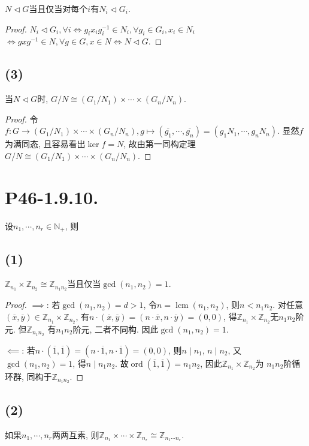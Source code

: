 \documentclass[12pt, a4paper, fontset=windows]{ctexart}
\newcommand{\N}{\mathbb{N}}
\newcommand{\Z}{\mathbb{Z}}
\newcommand{\cl}[1]{\overline{#1}} %
\newcommand{\isom}{\cong} %
\newcommand{\lcm}{\operatorname{lcm}}
\newcommand{\ord}{\operatorname{ord}}
\newcommand{\timess}{\times\cdots\times}
\begin{document}
$N\lhd G$当且仅当对每个$i$有$N_i\lhd G_i$. 

\begin{proof}
$N_i\lhd G_i,\forall i\iff g_ix_ig_i^{-1}\in N_i,
\forall g_i\in G_i,x_i\in N_i$
$\iff gxg^{-1}\in N,\forall g\in G,x\in N\iff N\lhd G$. 
\end{proof}

\subsection*{(3)}

当$N\lhd G$时, $G/N\isom(G_1/N_1)\timess(G_n/N_n)$. 

\begin{proof}
令$f:G\to (G_1/N_1)\timess(G_n/N_n),g\mapsto(\cl{g_1},\cdots,\cl{g_n})=(g_1N_1,\cdots,g_nN_n)$. 
显然$f$为满同态, 且容易看出$\ker f=N$, 故由第一同构定理
$G/N\isom(G_1/N_1)\timess(G_n/N_n)$. 
\end{proof}

\section*{P46-1.9.10.}

设$n_1,\cdots,n_r\in\N_+$, 则

\subsection*{(1)}

$\Z_{n_1}\times\Z_{n_2}\isom\Z_{n_1n_2}$当且仅当$\gcd(n_1,n_2)=1$. 

\begin{proof}
$\implies$: 若$\gcd(n_1,n_2)=d>1$, 令$n=\lcm(n_1,n_2)$, 则$n<n_1n_2$. 
对任意$(\cl{x},\cl{y})\in\Z_{n_1}\times\Z_{n_2}$, 
有$n\cdot(\cl{x},\cl{y})=(n\cdot\cl{x},n\cdot\cl{y})=(0,0)$, 
得$\Z_{n_1}\times\Z_{n_2}$无$n_1n_2$阶元. 但$\Z_{n_1n_2}$
有$n_1n_2$阶元, 二者不同构. 因此$\gcd(n_1,n_2)=1$. 

$\impliedby$: 若$n\cdot(\cl{1},\cl{1})=(n\cdot\cl{1},n\cdot\cl{1})=(0,0)$, 
则$n\mid n_1$, $n\mid n_2$, 又$\gcd(n_1,n_2)=1$, 得$n\mid n_1n_2$. 
故$\ord(\cl{1},\cl{1})=n_1n_2$, 因此$\Z_{n_1}\times\Z_{n_2}$为
$n_1n_2$阶循环群, 同构于$\Z_{n_1n_2}$. 
\end{proof}

\subsection*{(2)}

如果$n_1,\cdots,n_r$两两互素, 则$\Z_{n_1}\timess\Z_{n_r}\isom\Z_{n_1\cdots n_r}$. 
\end{document}
